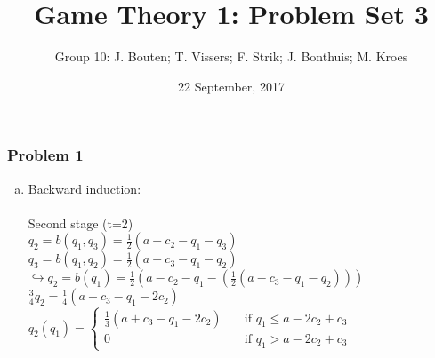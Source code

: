 \documentclass[a4paper]{article}
\author{Group 10: J. Bouten; T. Vissers; F. Strik; J. Bonthuis; M. Kroes}
\date{22 September, 2017}
\title{Game Theory 1: Problem Set 3}
\begin{document}
\maketitle
\subsubsection{Problem 1}
\begin{enumerate}[(a)]
\item
Backward induction: \\ \\
Second stage (t=2)\\

$q_2=b(q_1,q_3)=\frac{1}{2}(a-c_2-q_1-q_3)$\\
$q_3=b(q_1,q_2)=\frac{1}{2}(a-c_3-q_1-q_2)$\\

$\hookrightarrow q_2=b(q_1)=\frac{1}{2}(a-c_2-q_1-(\frac{1}{2}(a-c_3-q_1-q_2)))$\\
$\frac{3}{4}q_2=\frac{1}{4}(a+c_3-q_1-2c_2)$\\

$q_2(q_1)=\begin{cases}
\frac{1}{3}(a+c_3-q_1-2c_2) & \quad \text{if }
q_1 \le a-2c_2+c_3\\
0 & \quad \text{if } q_1>a-2c_2+c_3
\end{cases}
$
\\ 


\end{enumerate}
\end{document}
